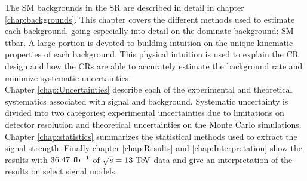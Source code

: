 \indent The SM backgrounds in the SR are described in detail in chapter \ref{chap:backgrounds}.  This chapter covers the different methods used to estimate each background, going especially into detail on the dominate background: SM ttbar.  A large portion is devoted to building intuition on the unique kinematic properties of each background.  This physical intuition is used to explain the CR design and how the CRs are able to accurately estimate the background rate and minimize systematic uncertainties.  \\

\indent Chapter \ref{chap:Uncertainties} describe each of the experimental and theoretical systematics associated with signal and background.  Systematic uncertainty is divided into two categories; experimental uncertainties due to limitations on detector resolution and theoretical uncertainties on the Monte Carlo simulations. \\

\indent Chapter \ref{chap:statistics} summarizes the statistical methods used to extract the signal strength.  Finally chapter \ref{chap:Results} and \ref{chap:Interpretation} show the results with $36.47$ $\mbox{fb$^{-1}$}$ of $\sqrt{s} = 13 \tev$ data and give an interpretation of the results on select signal models.  \\



